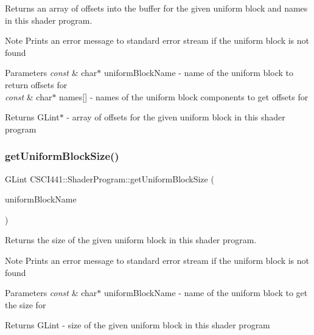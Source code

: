 Returns an array of offsets into the buffer for the given uniform block and names in this shader program. 

\begin{DoxyNote}{Note}
Prints an error message to standard error stream if the uniform block is not found 
\end{DoxyNote}

\begin{DoxyParams}{Parameters}
{\em const} & char$\ast$ uniform\+Block\+Name -\/ name of the uniform block to return offsets for \\
\hline
{\em const} & char$\ast$ names\mbox{[}\mbox{]} -\/ names of the uniform block components to get offsets for \\
\hline
\end{DoxyParams}
\begin{DoxyReturn}{Returns}
G\+Lint$\ast$ -\/ array of offsets for the given uniform block in this shader program 
\end{DoxyReturn}
\mbox{\label{class_c_s_c_i441_1_1_shader_program_a73f10d773f7ac81c92b899a8bd6826d8}} 
\subsubsection{\texorpdfstring{get\+Uniform\+Block\+Size()}{getUniformBlockSize()}}
{\footnotesize\ttfamily G\+Lint C\+S\+C\+I441\+::\+Shader\+Program\+::get\+Uniform\+Block\+Size (\begin{DoxyParamCaption}\item[{const char $\ast$}]{uniform\+Block\+Name }\end{DoxyParamCaption})}



Returns the size of the given uniform block in this shader program. 

\begin{DoxyNote}{Note}
Prints an error message to standard error stream if the uniform block is not found 
\end{DoxyNote}

\begin{DoxyParams}{Parameters}
{\em const} & char$\ast$ uniform\+Block\+Name -\/ name of the uniform block to get the size for \\
\hline
\end{DoxyParams}
\begin{DoxyReturn}{Returns}
G\+Lint -\/ size of the given uniform block in this shader program 
\end{DoxyReturn}
\mbox{\label{class_c_s_c_i441_1_1_shader_program_a196a95f51d3f85a32074ca7b0aba428f}} 
